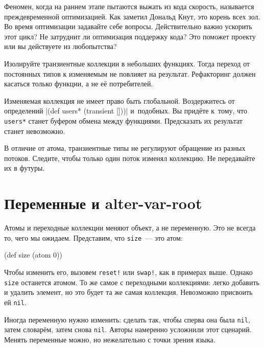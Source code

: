 
Феномен, когда на раннем этапе пытаются выжать из кода скорость, называется
преждевременной оптимизацией. Как заметил Дональд Кнут, это корень всех зол. Во
время оптимизации задавайте себе вопросы. Действительно важно ускорить этот
цикл? Не затруднит ли оптимизация поддержку кода? Это поможет проекту или вы
действуете из любопытства?

Изолируйте транзиентные коллекции в небольших функциях. Тогда переход от
постоянных типов к изменяемым не повлияет на результат. Рефакторинг должен
касаться только функции, а не её потребителей.

Изменяемая коллекция не имеет право быть глобальной. Воздержитесь от определений
\spverb|(def users* (transient []))| и~подобных. Вы придёте к~тому, что
\verb|users*| станет буфером обмена между функциями. Предсказать их результат
станет невозможно.

В отличие от атома, транзиентные типы не регулируют обращение из разных
потоков. Следите, чтобы только один поток изменял коллекцию. Не передавайте их в
футуры.

\section{Переменные и alter-var-root}


\label{alter-var-root}

Атомы и переходные коллекции меняют объект, а не переменную. Это не всегда то,
чего мы ожидаем. Представим, что \verb|size|~--- это атом:

\begin{english}
  \begin{clojure}
(def size (atom 0))
  \end{clojure}
\end{english}

Чтобы изменить его, вызовем \verb|reset!| или \verb|swap!|, как в примерах
выше. Однако \verb|size| останется атомом. То же самое с переходными
коллекциями: легко добавить и удалить элемент, но это будет та же самая
коллекция. Невозможно присвоить ей \verb|nil|.

Иногда переменную нужно изменить: сделать так, чтобы сперва она была
\verb|nil|, затем словарём, затем снова \verb|nil|. Авторы намеренно
усложнили этот сценарий. Менять переменные можно, но нежелательно с точки зрения
языка.

